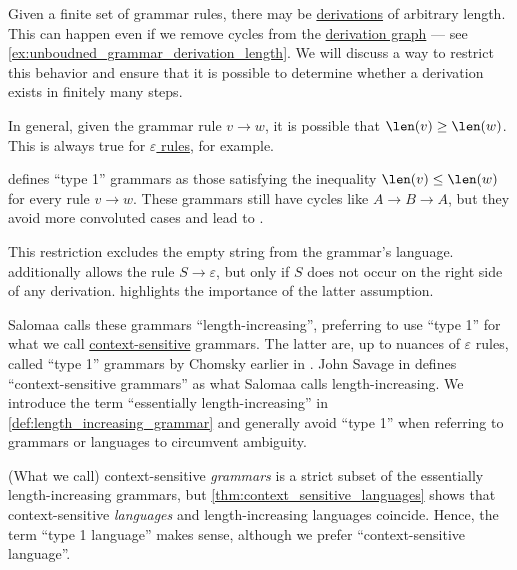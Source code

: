 \begin{remark}\label{rem:length_increasing_grammar}
  Given a finite set of grammar rules, there may be \hyperref[def:formal_grammar/derivation]{derivations} of arbitrary length. This can happen even if we remove cycles from the \hyperref[def:formal_grammar/graph]{derivation graph} --- see \cref{ex:unboudned_grammar_derivation_length}. We will discuss a way to restrict this behavior and ensure that it is possible to determine whether a derivation exists in finitely many steps.

  In general, given the grammar rule \( v \to w \), it is possible that \( \len(v) \geq \len(w) \). This is always true for \hyperref[def:epsilon_free_grammar]{\( \varepsilon \) rules}, for example.

  \Textcite[361]{Chomsky1963Grammars} defines \enquote{type 1} grammars as those satisfying the inequality \( \len(v) \leq \len(w) \) for every rule \( v \to w \). These grammars still have cycles like \( A \to B \to A \), but they avoid more convoluted cases and lead to .

  This restriction excludes the empty string from the grammar's language. \Textcite[15]{Salomaa1973FormalLanguages} additionally allows the rule \( S \to \varepsilon \), but only if \( S \) does not occur on the right side of any derivation.  highlights the importance of the latter assumption.

  Salomaa calls these grammars \enquote{length-increasing}, preferring to use \enquote{type 1} for what we call \hyperref[def:chomsky_hierarchy/context_sensitive]{context-sensitive} grammars. The latter are, up to nuances of \( \varepsilon \) rules, called \enquote{type 1} grammars by Chomsky earlier in \cite[142]{Chomsky1959Grammars}. John Savage in \cite[def. 4.9.2]{Savage2008ModelsOfComputation} defines \enquote{context-sensitive grammars} as what Salomaa calls length-increasing. We introduce the term \enquote{essentially length-increasing} in \cref{def:length_increasing_grammar} and generally avoid \enquote{type 1} when referring to grammars or languages to circumvent ambiguity.

  (What we call) context-sensitive \emph{grammars} is a strict subset of the essentially length-increasing grammars, but \cref{thm:context_sensitive_languages} shows that context-sensitive \emph{languages} and length-increasing languages coincide. Hence, the term \enquote{type 1 language} makes sense, although we prefer \enquote{context-sensitive language}.
\end{remark}

